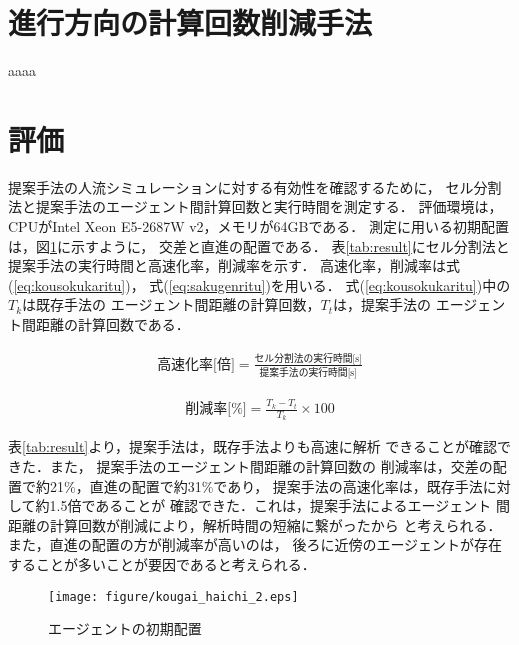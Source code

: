 \documentclass{maelab_y}
\begin{document}
\section{進行方向の計算回数削減手法}
aaaa


\section{評価}
提案手法の人流シミュレーションに対する有効性を確認するために，
セル分割法と提案手法のエージェント間計算回数と実行時間を測定する．
評価環境は，CPUがIntel Xeon E5-2687W v2，メモリが64GBである．
測定に用いる初期配置は，図\ref{fig:agent_haichi_image}に示すように，
交差と直進の配置である．
表\ref{tab:result}にセル分割法と提案手法の実行時間と高速化率，削減率を示す．
高速化率，削減率は式(\ref{eq:kousokukaritu})，
式(\ref{eq:sakugenritu})を用いる．
式(\ref{eq:kousokukaritu})中の$T_{k}$は既存手法の
エージェント間距離の計算回数，$T_{t}$は，提案手法の
エージェント間距離の計算回数である．

\begin{eqnarray}
  \label{eq:kousokukaritu}
  \mbox{高速化率[倍]} =
  \frac{\mbox{セル分割法の実行時間[s]}}{\mbox{提案手法の実行時間[s]}}
\end{eqnarray}

\begin{eqnarray}
  \label{eq:sakugenritu}
  \mbox{削減率[\%]} =
  \frac{T_{k} - T_{t}}{T_{k}} \times 100
\end{eqnarray}

\vspace{2mm}

表\ref{tab:result}より，提案手法は，既存手法よりも高速に解析
できることが確認できた．また，
提案手法のエージェント間距離の計算回数の
削減率は，交差の配置で約21\%，直進の配置で約31\%であり，
提案手法の高速化率は，既存手法に対して約1.5倍であることが
確認できた．これは，提案手法によるエージェント
間距離の計算回数が削減により，解析時間の短縮に繋がったから
と考えられる．また，直進の配置の方が削減率が高いのは，
後ろに近傍のエージェントが存在することが多いことが要因であると考えられる．

\vspace{-2mm}
\begin{figure}[hbtp]
 \begin{center}
  \texttt{[image: figure/kougai\_haichi\_2.eps]}
  \caption{エージェントの初期配置}
  \label{fig:agent_haichi_image}
 \end{center}
\end{figure}
\fi
\end{document}
